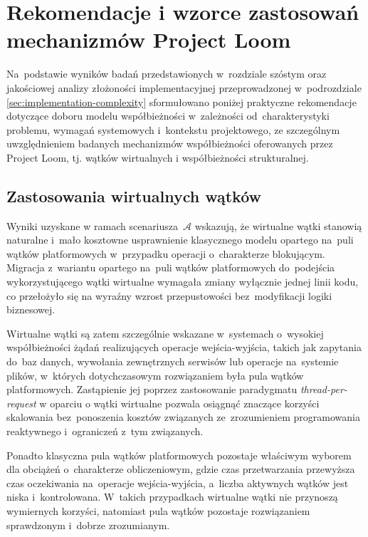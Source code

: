 \section{Rekomendacje i wzorce zastosowań mechanizmów Project Loom}

Na~podstawie wyników badań przedstawionych w~rozdziale szóstym oraz jakościowej analizy złożoności implementacyjnej przeprowadzonej w~podrozdziale \ref{sec:implementation-complexity} sformułowano poniżej praktyczne rekomendacje dotyczące doboru modelu współbieżności w~zależności od~charakterystyki problemu, wymagań systemowych i~kontekstu projektowego, ze szczególnym uwzględnieniem badanych mechanizmów współbieżności oferowanych przez Project Loom, tj. wątków wirtualnych i współbieżności strukturalnej.

\subsection{Zastosowania wirtualnych wątków}

Wyniki uzyskane w ramach scenariusza~$\mathcal{A}$ wskazują, że wirtualne wątki stanowią naturalne i~mało kosztowne usprawnienie klasycznego modelu opartego na~puli wątków platformowych w~przypadku operacji o~charakterze blokującym. Migracja z~wariantu opartego na~puli wątków platformowych do~podejścia wykorzystującego wątki wirtualne wymagała zmiany wyłącznie jednej linii kodu, co przełożyło się na wyraźny wzrost przepustowości bez~modyfikacji logiki biznesowej.

Wirtualne wątki są zatem szczególnie wskazane w~systemach o~wysokiej współbieżności żądań realizujących operacje wejścia-wyjścia, takich jak zapytania do~baz danych, wywołania zewnętrznych serwisów lub operacje na~systemie plików, w~których dotychczasowym rozwiązaniem była pula wątków platformowych. Zastąpienie jej poprzez zastosowanie paradygmatu \emph{thread-per-request} w oparciu o wątki wirtualne pozwala osiągnąć znaczące korzyści skalowania bez~ponoszenia kosztów związanych ze~zrozumieniem programowania reaktywnego i~ograniczeń z~tym związanych.

Ponadto klasyczna pula wątków platformowych pozostaje właściwym wyborem dla obciążeń o~charakterze obliczeniowym, gdzie czas przetwarzania przewyższa czas oczekiwania na~operacje wejścia-wyjścia, a~liczba aktywnych wątków jest niska i~kontrolowana. W~takich przypadkach wirtualne wątki nie przynoszą wymiernych korzyści, natomiast pula wątków pozostaje rozwiązaniem sprawdzonym i~dobrze zrozumianym.

